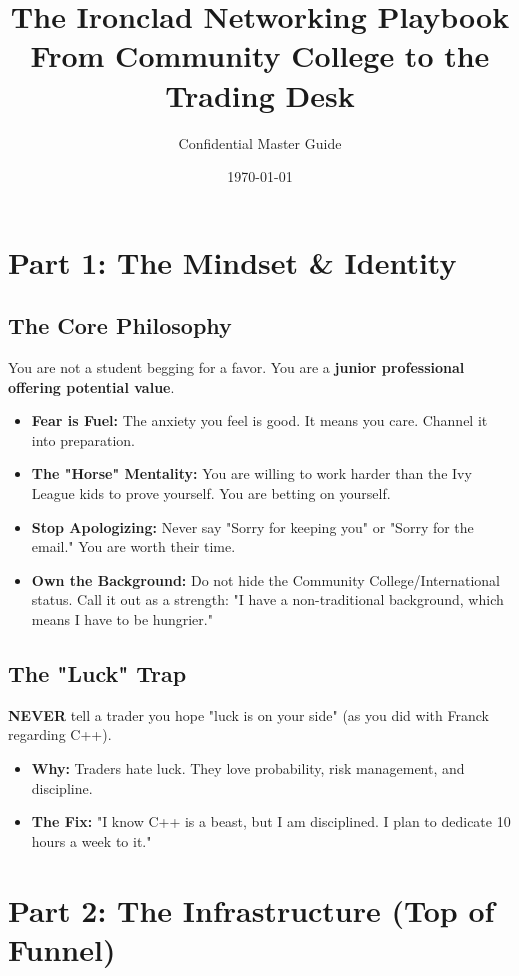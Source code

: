 \documentclass[11pt, a4paper]{article}
\title{\textbf{\HUGE The Ironclad Networking Playbook} \\ \large From Community College to the Trading Desk}
\author{Confidential Master Guide}
\date{\today}
\begin{document}
\maketitle

\section{Part 1: The Mindset \& Identity}

\subsection{The Core Philosophy}
You are not a student begging for a favor. You are a \textbf{junior professional offering potential value}.
\begin{itemize}
    \item \textbf{Fear is Fuel:} The anxiety you feel is good. It means you care. Channel it into preparation.
    \item \textbf{The "Horse" Mentality:} You are willing to work harder than the Ivy League kids to prove yourself. You are betting on yourself.
    \item \textbf{Stop Apologizing:} Never say "Sorry for keeping you" or "Sorry for the email." You are worth their time.
    \item \textbf{Own the Background:} Do not hide the Community College/International status. Call it out as a strength: "I have a non-traditional background, which means I have to be hungrier."
\end{itemize}

\subsection{The "Luck" Trap}
\textbf{NEVER} tell a trader you hope "luck is on your side" (as you did with Franck regarding C++).
\begin{itemize}
    \item \textbf{Why:} Traders hate luck. They love probability, risk management, and discipline.
    \item \textbf{The Fix:} "I know C++ is a beast, but I am disciplined. I plan to dedicate 10 hours a week to it."
\end{itemize}

\section{Part 2: The Infrastructure (Top of Funnel)}
\end{document}
